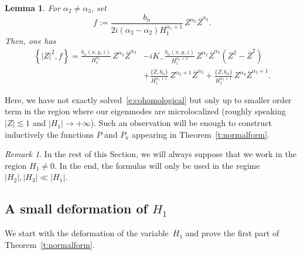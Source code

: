 \documentclass[10pt]{amsart}
\theoremstyle{plain}
\newtheorem{lemm}[theo]{Lemma}
\theoremstyle{definition}
\theoremstyle{remark}
\newtheorem{rema}[theo]{Remark}
\begin{document}
\begin{lemm}\label{l:cohomological} For $\alpha_2\neq \alpha_3$, set
\[
f:=\frac{b_\alpha}{2i(\alpha_3-\alpha_2)H_1^{\alpha_1+1}}\,Z^{\alpha_2}\overline{Z}^{\alpha_3}.
\]
Then, one has
\begin{align*}
\left\{|Z|^2,f\right\} =\frac{b_\alpha(x,y,z)}{H_1^{\alpha_1}}\,Z^{\alpha_2}\overline{Z}^{\alpha_3}&-iK_-\frac{b_\alpha(x,y,z)}{H_1^{\alpha_1+2}}\,Z^{\alpha_2}\overline{Z}^{\alpha_3}(Z^2-\overline{Z}^2)\\
& +\frac{\{\overline{Z},b_\alpha\}}{H_1^{\alpha_1+1}}\,Z^{\alpha_2+1}\overline{Z}^{\alpha_3}+\frac{\{Z,b_\alpha\}}{H_1^{\alpha_1+1}}\,Z^{\alpha_2}\overline{Z}^{\alpha_3+1}.
\end{align*}
\end{lemm}
Here, we have not exactly solved~\eqref{e:cohomological} but only up to smaller order term in the region where our eigenmodes are microlocalized (roughly speaking $|Z|\lesssim1$ and $|H_1|\to+\infty$). Such an observation will be enough to construct inductively the functions $P$ and $P_a$ appearing in Theorem~\ref{t:normalform}.

\begin{rema}
In the rest of this Section, we will always suppose that we work in the region $H_1\neq 0$. In the end, the formulas will only be used in the regime $|H_2|,|H_3|\ll |H_1|$.
\end{rema}

\subsection{A small deformation of $H_1$}
We start with the deformation of the variable~$H_1$ and prove the first part of Theorem~\ref{t:normalform}.
\end{document}
